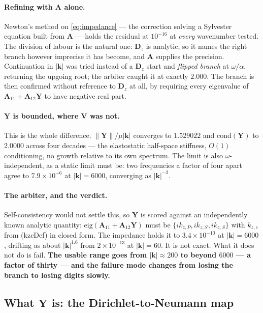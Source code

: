 \documentclass[11pt,a4paper]{article}
\newcommand{\bA}{\mathbf{A}}
\newcommand{\bV}{\mathbf{V}}
\newcommand{\bY}{\mathbf{Y}}
\begin{document}
\paragraph{Refining with $\bA$ alone.}  Newton's method on
\eqref{eq:impedance} --- the correction solving a Sylvester equation built from
$\bA$ --- holds the residual at $10^{-16}$ at \emph{every} wavenumber tested.
The division of labour is the natural one: $\mathbf{D}_z$ is analytic, so it
names the right branch however imprecise it has become, and $\bA$ supplies the
precision.  Continuation in $|\mathbf{k}|$ was tried instead of a
$\mathbf{D}_z$ start and \emph{flipped branch} at $\omega/\alpha$, returning the
upgoing root; the arbiter caught it at exactly $2.000$.  The branch is then
confirmed without reference to $\mathbf{D}_z$ at all, by requiring every
eigenvalue of $\bA_{11}+\bA_{12}\bY$ to have negative real part.

\paragraph{$\bY$ is bounded, where $\bV$ was not.}  This is the whole
difference.  $\|\bY\|/\mu|\mathbf{k}|$ converges to $1.529022$ and
$\mathrm{cond}(\bY)$ to $2.0000$ across four decades --- the elastostatic
half-space stiffness, $O(1)$ conditioning, no growth relative to its own
spectrum.  The limit is also $\omega$-independent, as a static limit must be:
two frequencies a factor of four apart agree to $7.9\times10^{-6}$ at
$|\mathbf{k}| = 6000$, converging as $|\mathbf{k}|^{-2}$.

\paragraph{The arbiter, and the verdict.}  Self-consistency would not settle
this, so $\bY$ is scored against an independently known analytic quantity:
$\mathrm{eig}(\bA_{11}+\bA_{12}\bY)$ must be $\{ik_{z,P},ik_{z,S},ik_{z,S}\}$
with $k_{z,c}$ from (kzcDef) in closed form.  The impedance holds it to
$3.4\times10^{-10}$ at $|\mathbf{k}| = 6000$, drifting as about
$|\mathbf{k}|^{1.6}$ from $2\times10^{-13}$ at $|\mathbf{k}| = 60$.  It is not
exact.  What it does not do is fail.  \textbf{The usable range goes from
$|\mathbf{k}|\approx200$ to beyond $6000$ --- a factor of thirty --- and the
failure mode changes from losing the branch to losing digits slowly.}

\subsection{What $\bY$ is: the Dirichlet-to-Neumann
map}\label{sec:dtn}
\end{document}
